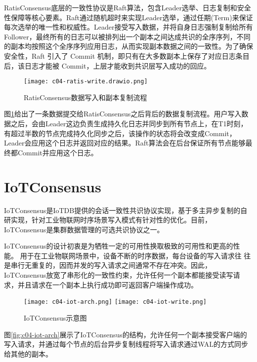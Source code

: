 RatisConsensus底层的一致性协议是Raft算法，包含Leader选举、日志复制和安全性保障等核心要素。Raft通过随机超时来实现Leader选举，通过任期(Term)来保证每次选举的唯一性和权威性。Leader接受写入数据，并将自身日志强制复制给所有Follower，最终所有的日志可以被排列出一个副本之间达成共识的全序序列，不同的副本均按照这个全序序列应用日志，从而实现副本数据之间的一致性。为了确保安全性，Raft 引入了 Commit 机制，即只有在大多数副本上保存了对应日志条目后，该日志才能被 Commit，上层才能收到共识层写入成功的回应。

\begin{figure}
  \centering
  \texttt{[image: c04-ratis-write.drawio.png]}
  \caption{RatisConsensus数据写入和副本复制流程}
  \label{fig:c04-ratis-write}
\end{figure}

图\ref{fig:c04-ratis-write}给出了一条数据提交给RatisConsensus之后背后的数据复制流程。用户写入数据之后，会由Leader这边负责生成持久化日志并同步到所有节点上，在T1时刻，有超过半数的节点完成持久化同步之后，该操作的状态将会改变成Commit，Leader会应用这个日志并返回对应的结果。Raft算法会在后台保证所有节点能够最终都Commit并应用这个日志。



\section{IoTConsensus}

IoTConsensus是IoTDB提供的会话一致性共识协议实现，基于多主异步复制的自研实现，针对工业物联网时序场景写入模式有针对性的优化。目前，IoTConsensus是集群数据管理的可选共识协议之一。

IoTConsensus的设计初衷是为牺牲一定的可用性换取极致的可用性和更高的性能。
用于在工业物联网场景中，设备不断的时序数据，每台设备的写入请求往
往是串行无重复的，因而并发的写入请求之间通常不存在冲突。因此，IoTConsensus放宽了串形化的一致性约束，允许任何一个副本都能接受读写请求，并且请求在一个副本上执行成功即可返回客户端操作成功。


\begin{figure}
  \centering
    {\texttt{[image: c04-iot-arch.png]}}
    {\texttt{[image: c04-iot-write.png]}}
  \caption{IoTConsensus示意图}
  \label{fig:c04-iot-consensus}
\end{figure}

图\ref{fig:c04-iot-arch}展示了IoTConsensus的结构，允许任何一个副本接受客户端的写入请求，并通过每个节点的后台异步复制线程将写入请求通过WAL的方式同步给其他的副本。


